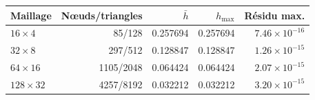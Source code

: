 \begin{tabular}{lrrrr}
\toprule
Maillage & Nœuds/triangles & \(\bar h\) & \(h_{\max}\) & Résidu max. \\
\midrule
\(16\times4\) & 85/128 & 0.257694 & 0.257694 & \(7.46\times10^{-16}\) \\
\(32\times8\) & 297/512 & 0.128847 & 0.128847 & \(1.26\times10^{-15}\) \\
\(64\times16\) & 1105/2048 & 0.064424 & 0.064424 & \(2.07\times10^{-15}\) \\
\(128\times32\) & 4257/8192 & 0.032212 & 0.032212 & \(3.20\times10^{-15}\) \\
\bottomrule
\end{tabular}
